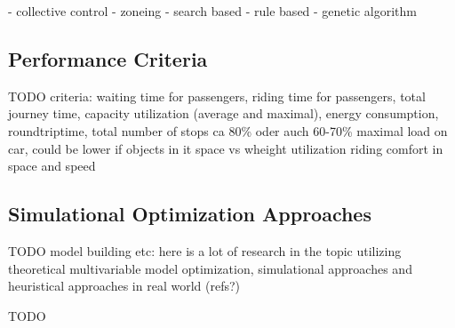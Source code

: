 \autocite[][pp.~3--6]{axelsson2013strategies}
- collective control
- zoneing
- search based
- rule based
- genetic algorithm




\subsection{Performance Criteria}
TODO
criteria: waiting time for passengers, riding time for passengers, total journey time, capacity utilization (average and maximal), energy consumption, roundtriptime, total number of stops
ca 80\% oder auch 60-70\% maximal load on car, could be lower if objects in it
space vs wheight utilization
riding comfort in space and speed

\autocite[][p.~10]{beers2015arrivals}


\subsection{Simulational Optimization Approaches}
TODO
model building etc: here is a lot of research in the topic utilizing theoretical multivariable model optimization, simulational approaches and heuristical approaches in real world (refs?)

\autocite[][pp.~7--11]{beers2015arrivals}
\autocite[][p.~193]{unger2015aufzuege}


TODO
